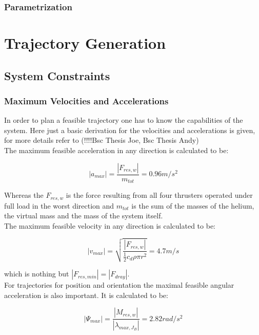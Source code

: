 \subsubsection{Parametrization}

\section{Trajectory Generation}
\label{sec:trajectoryGeneration}
\subsection{System Constraints}
\subsubsection{Maximum Velocities and Accelerations}
In order to plan a feasible trajectory one has to know the capabilities of the system. Here just a basic derivation for the velocities and accelerations is given, for more details refer to (!!!!Bsc Thesis Joe, Bsc Thesis Andy)\\

The maximum feasible acceleration in any direction is calculated to be:

\begin{equation}
  \left|a_{max} \right| =  \frac{\left|F_{res, w}\right|}{m_{tot}} = 0.96 m/s^2
\end{equation}

Whereas the $F_{res,w}$ is the force resulting from all four thrusters operated under full load in the worst direction and $m_{tot}$ is the sum of the masses of the helium, the virtual mass and the mass of the system itself.\\


The maximum feasible velocity in any direction is calculated to be:

\begin{equation}
\left|v_{max} \right| = \sqrt{\frac{\left|F_{res,w} \right|}{\frac{1}{2}c_d \rho \pi r^2}}=4.7 m/s
\end{equation}

which is nothing but $ \left|F_{res,min} \right| = \left|F_{dray} \right| $.\\

For trajectories for position and orientation the maximal feasible angular acceleration is also important. It is calculated to be:

\begin{equation}
  \left|\Psi_{max} \right| =  \frac{\left|M_{res,w}\right|}{\left| \lambda_{max, J_{B}} \right|} = 2.82 rad/s^2 
\end{equation}

